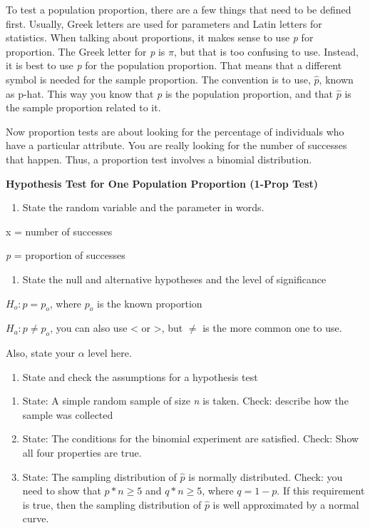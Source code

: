 \documentclass[
]{book}
\providecommand{\tightlist}{%
  \setlength{\itemsep}{0pt}\setlength{\parskip}{0pt}}
\begin{document}
To test a population proportion, there are a few things that need to be defined first. Usually, Greek letters are used for parameters and Latin letters for statistics. When talking about proportions, it makes sense to use \emph{p} for proportion. The Greek letter for \emph{p} is \(\pi\), but that is too confusing to use. Instead, it is best to use \emph{p} for the population proportion. That means that a different symbol is needed for the sample proportion. The convention is to use, \(\hat{p}\), known as p-hat. This way you know that \emph{p} is the population proportion, and that \(\hat{p}\) is the sample proportion related to it.

Now proportion tests are about looking for the percentage of individuals who have a particular attribute. You are really looking for the number of successes that happen. Thus, a proportion test involves a binomial distribution.

\textbf{Hypothesis Test for One Population Proportion (1-Prop Test)}

\begin{enumerate}
\def\labelenumi{\arabic{enumi}.}
\tightlist
\item
  State the random variable and the parameter in words.
\end{enumerate}

x = number of successes

\emph{p} = proportion of successes

\begin{enumerate}
\def\labelenumi{\arabic{enumi}.}
\setcounter{enumi}{1}
\tightlist
\item
  State the null and alternative hypotheses and the level of
  significance
\end{enumerate}

\(H_o:p=p_o\), where \(p_o\) is the known proportion

\(H_a:p\ne p_o\), you can also use \textless{} or \textgreater, but \(\ne\) is the more common one to use.

Also, state your \(\alpha\) level here.

\begin{enumerate}
\def\labelenumi{\arabic{enumi}.}
\setcounter{enumi}{2}
\tightlist
\item
  State and check the assumptions for a hypothesis test
\end{enumerate}

\begin{enumerate}
\def\labelenumi{\alph{enumi}.}
\item
  State: A simple random sample of size \emph{n} is taken. Check: describe how the sample was collected
\item
  State: The conditions for the binomial experiment are satisfied. Check: Show all four properties are true.
\item
  State: The sampling distribution of \(\hat{p}\) is normally distributed. Check: you need to show that \(p*n\ge5\) and \(q*n\ge5\), where \(q=1-p\). If this requirement is true, then the sampling distribution of \(\hat{p}\) is well approximated by a normal curve.
\end{enumerate}
\end{document}
